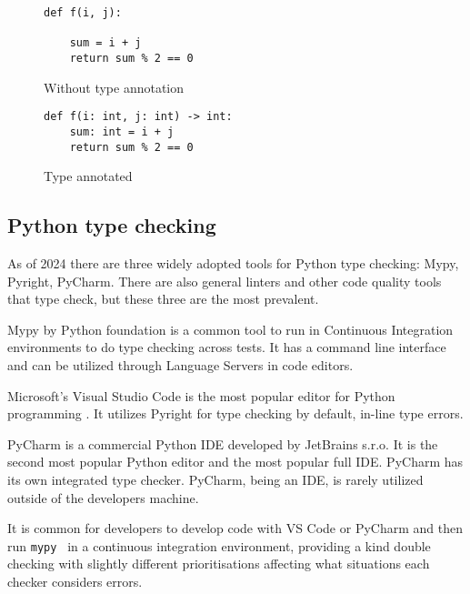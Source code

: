 \begin{figure}[t]
    \centering
     \begin{minipage}{.45\textwidth}
        \centering
        \begin{lstlisting}[linewidth=\textwidth]
def f(i, j):

    sum = i + j
    return sum % 2 == 0
        \end{lstlisting}
        \caption{Without type annotation}
        \label{untyped_code}
    \end{minipage}%
    \begin{minipage}{.45\textwidth}
        \centering
        \begin{lstlisting}[linewidth=\textwidth]
def f(i: int, j: int) -> int:
    sum: int = i + j
    return sum % 2 == 0
        \end{lstlisting}
        \caption{Type annotated}
        \label{typed_code}
    \end{minipage}
\end{figure}

\subsection{Python type checking}

As of 2024 there are three widely adopted tools for Python type checking: Mypy, Pyright, PyCharm. There are also general linters and other code quality tools that type check, but these three are the most prevalent.

Mypy by Python foundation is a common tool to run in Continuous Integration environments to do type checking across tests. It has a command line interface and can be utilized through Language Servers in code editors. 

Microsoft's Visual Studio Code is the most popular editor for Python programming \cite{python_software_foundation_jetbrains_sro_python_nodate}. It utilizes Pyright for type checking by default, in-line type errors.

PyCharm is a commercial Python IDE developed by JetBrains s.r.o. It is the second most popular Python editor and the most popular full IDE. PyCharm has its own integrated type checker. PyCharm, being an IDE, is rarely utilized outside of the developers machine. 

It is common for developers to develop code with VS Code or PyCharm and then run {\tt mypy } in a continuous integration environment, providing a kind double checking with slightly different prioritisations affecting what situations each checker considers errors.

